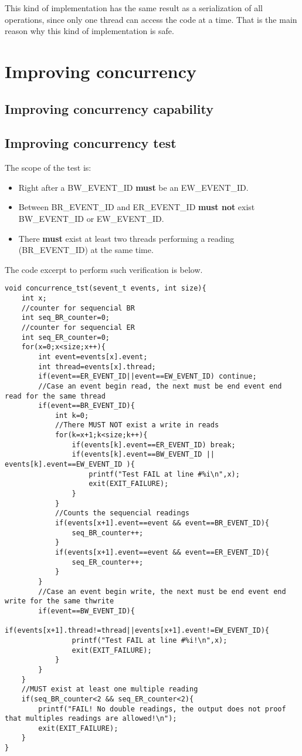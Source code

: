 \documentclass{article}
\begin{document}
		This kind of implementation has the same result as a serialization of all operations, since 
		only one thread can access the code at a time. That is the main reason why this kind of 
		implementation is safe.

\section{Improving concurrency}

	\subsection{Improving concurrency capability}

		

	\subsection{Improving concurrency test}

		The scope of the test is:
		\begin{itemize}
		\item Right after a \uppercase{bw\_event\_id} \textbf{must} be an \uppercase{ew\_event\_id}.
		\item Between \uppercase{br\_event\_id} and \uppercase{er\_event\_id} \textbf{must not} exist \uppercase{bw\_event\_id} or \uppercase{ew\_event\_id}.
		\item There \textbf{must} exist at least two threads performing a reading (\uppercase{br\_event\_id}) at the same time.
		\end{itemize}

		The code excerpt to perform such verification is below. 

	\begin{lstlisting}
void concurrence_tst(sevent_t events, int size){
	int x;
	//counter for sequencial BR
	int seq_BR_counter=0;
	//counter for sequencial ER
	int seq_ER_counter=0;
	for(x=0;x<size;x++){
		int event=events[x].event;
		int thread=events[x].thread;
		if(event==ER_EVENT_ID||event==EW_EVENT_ID) continue;
		//Case an event begin read, the next must be end event end read for the same thread
		if(event==BR_EVENT_ID){
			int k=0;
			//There MUST NOT exist a write in reads
			for(k=x+1;k<size;k++){
				if(events[k].event==ER_EVENT_ID) break;		
				if(events[k].event==BW_EVENT_ID || events[k].event==EW_EVENT_ID ){
					printf("Test FAIL at line #%i\n",x);
					exit(EXIT_FAILURE);
				}
			}
			//Counts the sequencial readings
			if(events[x+1].event==event && event==BR_EVENT_ID){
				seq_BR_counter++;
			}
			if(events[x+1].event==event && event==ER_EVENT_ID){
				seq_ER_counter++;
			}
		}	
		//Case an event begin write, the next must be end event end write for the same thwrite
		if(event==BW_EVENT_ID){
			if(events[x+1].thread!=thread||events[x+1].event!=EW_EVENT_ID){
				printf("Test FAIL at line #%i!\n",x);
				exit(EXIT_FAILURE);
			}
		}
	}
	//MUST exist at least one multiple reading
	if(seq_BR_counter<2 && seq_ER_counter<2){
		printf("FAIL! No double readings, the output does not proof that multiples readings are allowed!\n");
		exit(EXIT_FAILURE);
	}
}
	\end{lstlisting}
\end{document}

